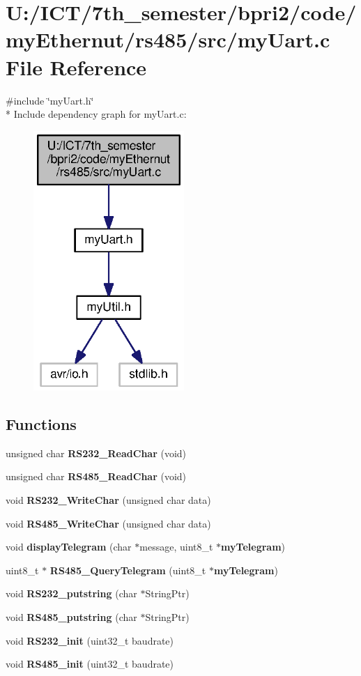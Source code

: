 \section{U\+:/\+I\+C\+T/7th\+\_\+semester/bpri2/code/my\+Ethernut/rs485/src/my\+Uart.c File Reference}
\label{my_uart_8c}
{\ttfamily \#include \char`\"{}my\+Uart.\+h\char`\"{}}\\*
Include dependency graph for my\+Uart.\+c\+:\nopagebreak
\begin{figure}[H]
\begin{center}
\leavevmode
\includegraphics[width=162pt]{my_uart_8c__incl}
\end{center}
\end{figure}
\subsection*{Functions}
\begin{DoxyCompactItemize}
\item 
unsigned char {\bf R\+S232\+\_\+\+Read\+Char} (void)
\item 
unsigned char {\bf R\+S485\+\_\+\+Read\+Char} (void)
\item 
void {\bf R\+S232\+\_\+\+Write\+Char} (unsigned char data)
\item 
void {\bf R\+S485\+\_\+\+Write\+Char} (unsigned char data)
\item 
void {\bf display\+Telegram} (char $\ast$message, uint8\+\_\+t $\ast${\bf my\+Telegram})
\item 
uint8\+\_\+t $\ast$ {\bf R\+S485\+\_\+\+Query\+Telegram} (uint8\+\_\+t $\ast${\bf my\+Telegram})
\item 
void {\bf R\+S232\+\_\+putstring} (char $\ast$String\+Ptr)
\item 
void {\bf R\+S485\+\_\+putstring} (char $\ast$String\+Ptr)
\item 
void {\bf R\+S232\+\_\+init} (uint32\+\_\+t baudrate)
\item 
void {\bf R\+S485\+\_\+init} (uint32\+\_\+t baudrate)
\end{DoxyCompactItemize}


